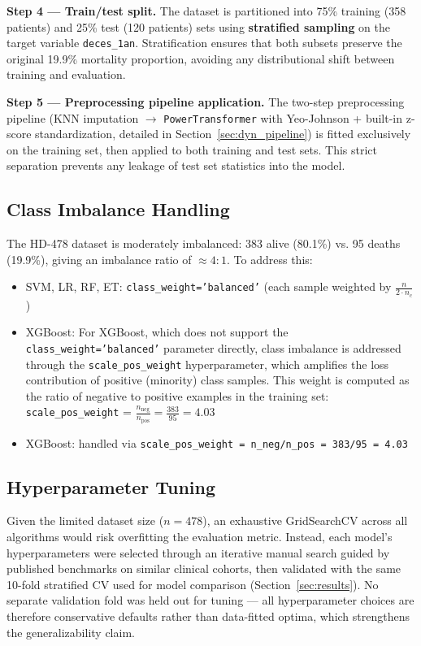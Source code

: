 \documentclass[12pt,a4paper,twoside]{report}
\begin{document}
\textbf{Step 4 — Train/test split.}
The dataset is partitioned into 75\% training (358 patients) and 25\% test (120 patients) sets using \textbf{stratified sampling} on the target variable \texttt{deces\_1an}. Stratification ensures that both subsets preserve the original 19.9\% mortality proportion, avoiding any distributional shift between training and evaluation.

\textbf{Step 5 — Preprocessing pipeline application.}
The two-step preprocessing pipeline (KNN imputation $\rightarrow$ \texttt{PowerTransformer} with Yeo-Johnson + built-in z-score standardization, detailed in Section~\ref{sec:dyn_pipeline}) is fitted exclusively on the training set, then applied to both training and test sets. This strict separation prevents any leakage of test set statistics into the model.

\subsection{Class Imbalance Handling}

The HD-478 dataset is moderately imbalanced: 383 alive (80.1\%) vs. 95 deaths (19.9\%), giving an imbalance ratio of $\approx4:1$. To address this:
\begin{itemize}
  \item SVM, LR, RF, ET: \texttt{class\_weight='balanced'} (each sample weighted by $\frac{n}{2 \cdot n_c}$)
  \item XGBoost: For XGBoost, which does not support the \texttt{class\_weight='balanced'} parameter directly, class imbalance is addressed through the \texttt{scale\_pos\_weight} hyperparameter, which amplifies the loss contribution of positive (minority) class samples. This weight is computed as the ratio of negative to positive examples in the training set: \texttt{scale\_pos\_weight} = $\frac{n_{\text{neg}}}{n_{\text{pos}}} = \frac{383}{95} = 4.03$
  \item XGBoost: handled via \texttt{scale\_pos\_weight = n\_neg/n\_pos = 383/95 = 4.03}
\end{itemize}

\subsection{Hyperparameter Tuning}

Given the limited dataset size ($n=478$), an exhaustive GridSearchCV across all algorithms would risk overfitting the evaluation metric. Instead, each model's hyperparameters were selected through an iterative manual search guided by published benchmarks on similar clinical cohorts, then validated with the same 10-fold stratified CV used for model comparison (Section~\ref{sec:results}). No separate validation fold was held out for tuning — all hyperparameter choices are therefore conservative defaults rather than data-fitted optima, which strengthens the generalizability claim.
\end{document}
